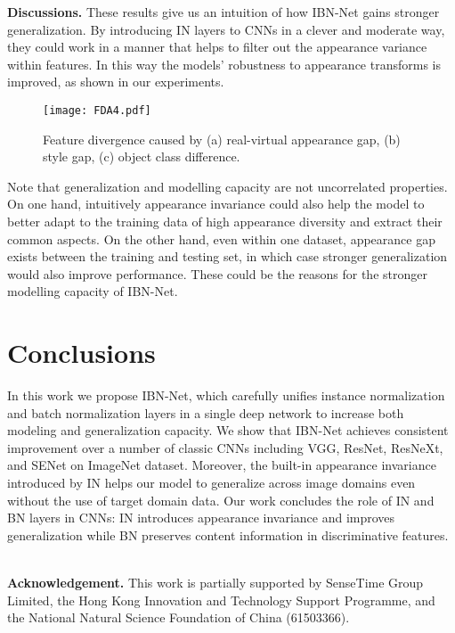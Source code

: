 \documentclass[runningheads]{llncs}
\begin{document}
\textbf{Discussions.} These results give us an intuition of how IBN-Net gains stronger generalization.
By introducing IN layers to CNNs in a clever and moderate way, they could work in a manner that helps to filter out the appearance variance within features.
In this way the models' robustness to appearance transforms is improved, as shown in our experiments.


\begin{figure*}[!t]
\centering
\texttt{[image: FDA4.pdf]}
\caption{\label{FDA} Feature divergence caused by (a) real-virtual appearance gap, (b) style gap, (c) object class difference. }
\end{figure*}

Note that generalization and modelling capacity are not uncorrelated properties.
On one hand, intuitively appearance invariance could also help the model to better adapt to the training data of high appearance diversity and extract their common aspects.
On the other hand, even within one dataset, appearance gap exists between the training and testing set, in which case stronger generalization would also improve performance.
These could be the reasons for the stronger modelling capacity of IBN-Net.

\section{Conclusions}

In this work we propose IBN-Net, which carefully unifies instance normalization and batch normalization layers in a single deep network to increase both modeling and generalization capacity.
We show that IBN-Net achieves consistent improvement over a number of classic CNNs including VGG, ResNet, ResNeXt, and SENet on ImageNet dataset.
Moreover, the built-in appearance invariance introduced by IN helps our model to generalize across image domains even without the use of target domain data.
Our work concludes the role of IN and BN layers in CNNs: IN introduces appearance invariance and improves generalization while BN preserves content information in discriminative features.

~\\
\textbf{Acknowledgement.} This work is partially supported by SenseTime Group Limited, the Hong Kong Innovation and Technology Support Programme, and the National Natural Science Foundation of China (61503366).





\end{document}
